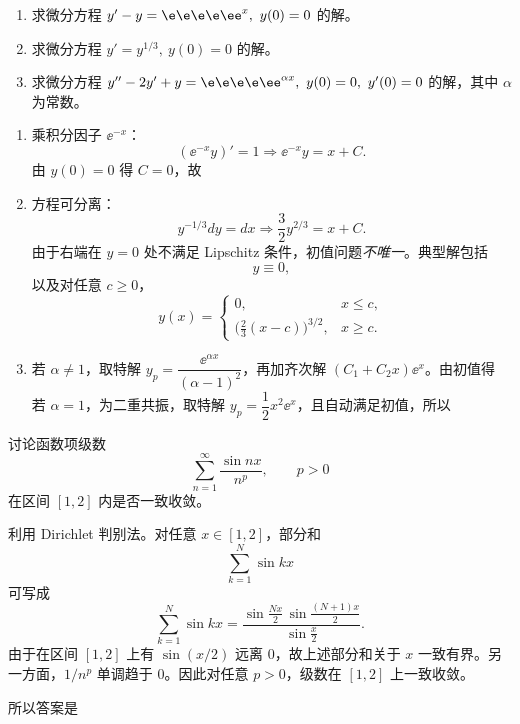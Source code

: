 ﻿

\begin{question}[三个初值问题]

\begin{enumerate}[label=(\arabic*),leftmargin=2.6em,itemsep=0.25em,topsep=0.2em]
\item 求微分方程 $y'-y=\e\e\e\e\ee^{x},\ y(0)=0$ 的解。
\item 求微分方程 $y'=y^{1/3},\ y(0)=0$ 的解。
\item 求微分方程 $y''-2y'+y=\e\e\e\e\ee^{\alpha x},\ y(0)=0,\ y'(0)=0$ 的解，其中 $\alpha$ 为常数。
\end{enumerate}

\begin{solution}

\begin{enumerate}[label=(\arabic*),leftmargin=2.6em,itemsep=0.25em,topsep=0.2em]
\item 乘积分因子 $\ee^{-x}$：
\[
 (\ee^{-x}y)'=1
 \Longrightarrow \ee^{-x}y=x+C.
\]
由 $y(0)=0$ 得 $C=0$，故

\item 方程可分离：
\[
 y^{-1/3}dy=dx
 \Longrightarrow \frac32 y^{2/3}=x+C.
\]
由于右端在 $y=0$ 处不满足 Lipschitz 条件，初值问题\emph{不唯一}。典型解包括
\[
 y\equiv 0,
\]
以及对任意 $c\ge 0$，
\[
 y(x)=
 \begin{cases}
 0,&x\le c,\\
 \bigl(\tfrac23(x-c)\bigr)^{3/2},&x\ge c.
 \end{cases}
\]

\item 若 $\alpha\ne 1$，取特解 $y_p=\dfrac{\ee^{\alpha x}}{(\alpha-1)^2}$，再加齐次解 $(C_1+C_2x)\ee^{x}$。由初值得
若 $\alpha=1$，为二重共振，取特解 $y_p=\dfrac12 x^2\ee^{x}$，且自动满足初值，所以
\end{enumerate}

\end{solution}
\end{question}

\begin{question}[一致收敛]

讨论函数项级数
\[
\sum_{n=1}^{\infty}\frac{\sin nx}{n^p},\qquad p>0
\]
在区间 $[1,2]$ 内是否一致收敛。

\begin{solution}

利用 Dirichlet 判别法。对任意 $x\in[1,2]$，部分和
\[
\sum_{k=1}^{N}\sin kx
\]
可写成
\[
\sum_{k=1}^{N}\sin kx=
\frac{\sin\frac{Nx}{2}\,\sin\frac{(N+1)x}{2}}{\sin\frac{x}{2}}.
\]
由于在区间 $[1,2]$ 上有 $\sin(x/2)$ 远离 $0$，故上述部分和关于 $x$ 一致有界。另一方面，$1/n^p$ 单调趋于 $0$。因此对任意 $p>0$，级数在 $[1,2]$ 上一致收敛。

所以答案是

\end{solution}
\end{question}


